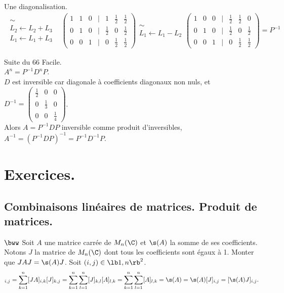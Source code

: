 \documentclass[11pt]{article}
\begin{document}
\begin{ex}{Une diagonalisation.}{}
\begin{align*}
        \substack{\sim\\ L_2\gets L_2 + L_3\\ L_1\gets L_1+L_3}&\begin{pmatrix}1&1&0&|&1&\frac{1}{2}&\frac{1}{2}\\0&1&0&|&\frac{1}{2}&0&\frac{1}{2}\\0&0&1&|&0&\frac{1}{2}&\frac{1}{2}\end{pmatrix}\substack{\sim\\ L_1\gets L_1 - L_2}\begin{pmatrix}1&0&0&|&\frac{1}{2}&\frac{1}{2}&0\\0&1&0&|&\frac{1}{2}&0&\frac{1}{2}\\0&0&1&|&0&\frac{1}{2}&\frac{1}{2}\end{pmatrix}=P^{-1}
    \end{align*}
\end{ex}

\begin{ex*}{Suite du 66}
     Facile.\\
     $A^n=P^{-1}D^nP$.\\
     $D$ est inversible car diagonale à coefficients diagonaux non nuls, et $D^{-1}=\begin{pmatrix}\frac{1}{2}&0&0\\0&\frac{1}{3}&0\\0&0&\frac{1}{4}\end{pmatrix}$.\\
    Alors $A=P^{-1}DP$ inversible comme produit d'inversibles, $A^{-1}=(P^{-1}DP)^{-1}=P^{-1}D^{-1}P$.
\end{ex*}

\section{Exercices.}

\subsection*{Combinaisons linéaires de matrices. Produit de matrices.}

\begin{exercice}{$\bww$}{}
    Soit $A$ une matrice carrée de $M_n(\C)$ et $\s(A)$ la somme de ses coefficients.\\
    Notons $J$ la matrice de $M_n(\C)$ dont tous les coefficients sont égaux à 1. Monter que $JAJ=\s(A)J$.
    \tcblower
    Soit $(i,j)\in\lb1,n\rb^2$.
    \begin{equation*}
        [JAJ]_{i,j}=\sum_{k=1}^n[JA]_{i,k}[J]_{k,j}=\sum_{k=1}^n\sum_{l=1}^n[J]_{k,l}[A]_{l,k}=\sum_{k=1}^n\sum_{l=1}^n[A]_{l,k}=\s(A)=\s(A)[J]_{i,j}=[\s(A)J]_{i,j}.
    \end{equation*}
\end{exercice}
\end{document}
